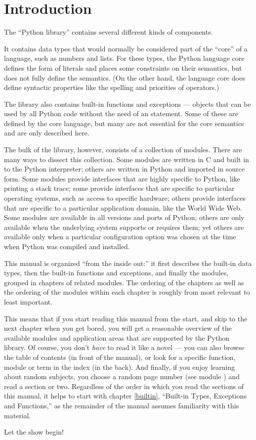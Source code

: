 \chapter{Introduction}
\label{intro}

The ``Python library'' contains several different kinds of components.

It contains data types that would normally be considered part of the
``core'' of a language, such as numbers and lists.  For these types,
the Python language core defines the form of literals and places some
constraints on their semantics, but does not fully define the
semantics.  (On the other hand, the language core does define
syntactic properties like the spelling and priorities of operators.)

The library also contains built-in functions and exceptions ---
objects that can be used by all Python code without the need of an
 statement.  Some of these are defined by the core
language, but many are not essential for the core semantics and are
only described here.

The bulk of the library, however, consists of a collection of modules.
There are many ways to dissect this collection.  Some modules are
written in C and built in to the Python interpreter; others are
written in Python and imported in source form.  Some modules provide
interfaces that are highly specific to Python, like printing a stack
trace; some provide interfaces that are specific to particular
operating systems, such as access to specific hardware; others provide
interfaces that are
specific to a particular application domain, like the World Wide Web.
Some modules are available in all versions and ports of Python; others
are only available when the underlying system supports or requires
them; yet others are available only when a particular configuration
option was chosen at the time when Python was compiled and installed.

This manual is organized ``from the inside out:'' it first describes
the built-in data types, then the built-in functions and exceptions,
and finally the modules, grouped in chapters of related modules.  The
ordering of the chapters as well as the ordering of the modules within
each chapter is roughly from most relevant to least important.

This means that if you start reading this manual from the start, and
skip to the next chapter when you get bored, you will get a reasonable
overview of the available modules and application areas that are
supported by the Python library.  Of course, you don't \emph{have} to
read it like a novel --- you can also browse the table of contents (in
front of the manual), or look for a specific function, module or term
in the index (in the back).  And finally, if you enjoy learning about
random subjects, you choose a random page number (see module
) and read a section or two.  Regardless of the
order in which you read the sections of this manual, it helps to start 
with chapter \ref{builtin}, ``Built-in Types, Exceptions and
Functions,'' as the remainder of the manual assumes familiarity with
this material.

Let the show begin!
